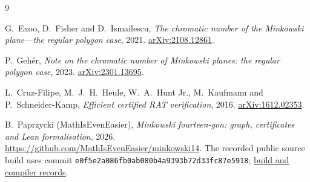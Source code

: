 \documentclass[11pt,a4paper]{article}
\theoremstyle{remark}
\newcommand{\code}[1]{\texttt{#1}}
\begin{document}
\begin{thebibliography}{9}
\raggedright
{}
G.~Exoo, D.~Fisher and D.~Ismailescu,
\emph{The chromatic number of the Minkowski plane---the regular polygon case},
2021. \href{https://arxiv.org/abs/2108.12861}{arXiv:2108.12861}.

P.~Geh\'er,
\emph{Note on the chromatic number of Minkowski planes: the regular polygon case},
2023. \href{https://arxiv.org/abs/2301.13695}{arXiv:2301.13695}.

L.~Cruz-Filipe, M.~J.~H.~Heule, W.~A.~Hunt Jr., M.~Kaufmann and
P.~Schneider-Kamp,
\emph{Efficient certified RAT verification},
2016. \href{https://arxiv.org/abs/1612.02353}{arXiv:1612.02353}.

B.~Paprzycki (MathIsEvenEasier),
\emph{Minkowski fourteen-gon: graph, certificates and Lean formalisation},
2026. \url{https://github.com/MathIsEvenEasier/minkowski14}.
The recorded public source build uses commit
\code{e0f5e2a086fb0ab080b4a9393b72d33fc87e5918};
\href{https://github.com/MathIsEvenEasier/minkowski14/actions/runs/37468510724}{build and compiler records}.
\end{thebibliography}
\end{document}
